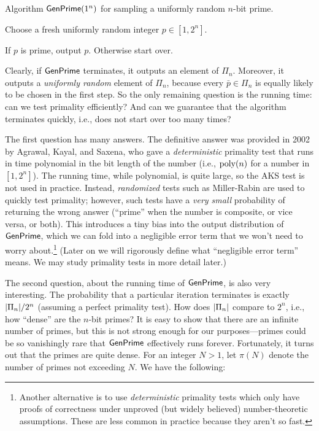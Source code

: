 \documentclass[11pt]{article}
\begin{document}
\begin{algorithm}
  \caption{Algorithm $\mathsf{GenPrime}(1^{n})$ for sampling a uniformly
    random $n$-bit prime.}
  \label{alg:genprime}
  \begin{algorithmic}[1]
    \STATE Choose a fresh uniformly random integer $p \in [1, 2^{n}]$.

    \STATE If $p$ is prime, output $p$.  Otherwise start over.
  \end{algorithmic}
\end{algorithm}

Clearly, if $\mathsf{GenPrime}$ terminates, it outputs an element of
$\Pi_{n}$.  Moreover, it outputs a \emph{uniformly random} element of
$\Pi_{n}$, because every $\bar{p} \in \Pi_{n}$ is equally likely to be
chosen in the first step.  So the only remaining question is the
running time: can we test primality efficiently?  And can we guarantee
that the algorithm terminates quickly, i.e., does not start over too
many times?

The first question has many answers.  The definitive answer was
provided in 2002 by Agrawal, Kayal, and Saxena, who gave a
\emph{deterministic} primality test that runs in time polynomial in
the bit length of the number (i.e., $\operatorname{poly}(n)$ for a number in
$[1,2^{n}]$).  The running time, while polynomial, is quite large, so
the AKS test is not used in practice.  Instead, \emph{randomized}
tests such as Miller-Rabin are used to quickly test primality;
however, such tests have a \emph{very small} probability of returning
the wrong answer (``prime'' when the number is composite, or vice
versa, or both).  This introduces a tiny bias into the output
distribution of $\mathsf{GenPrime}$, which we can fold into a negligible
error term that we won't need to worry about.\footnote{Another
  alternative is to use \emph{deterministic} primality tests which
  only have proofs of correctness under unproved (but widely believed)
  number-theoretic assumptions.  These are less common in practice
  because they aren't so fast.}  (Later on we will rigorously define
what ``negligible error term'' means.  We may study primality tests in
more detail later.)

The second question, about the running time of $\mathsf{GenPrime}$, is
also very interesting.  The probability that a particular iteration
terminates is exactly $\lvert\Pi_{n}\rvert / 2^{n}$ (assuming a perfect
primality test).  How does $\lvert\Pi_{n}\rvert$ compare to $2^{n}$, i.e.,
how ``dense'' are the $n$-bit primes?  It is easy to show that there
are an infinite number of primes, but this is not strong enough for
our purposes---primes could be so vanishingly rare that
$\mathsf{GenPrime}$ effectively runs forever.  Fortunately, it turns out
that the primes are quite dense.  For an integer $N > 1$, let $\pi(N)$
denote the number of primes not exceeding $N$.  We have the following:
\end{document}
